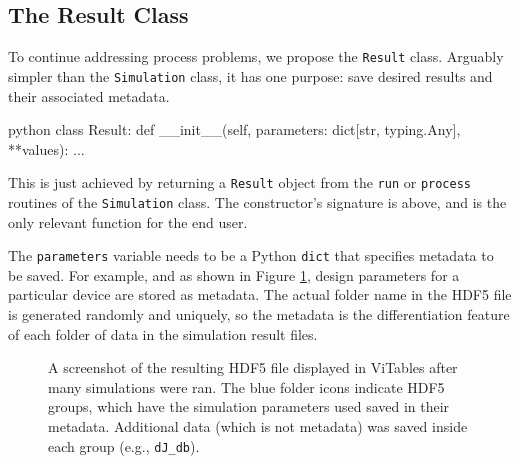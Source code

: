 \documentclass[12pt]{article}
\begin{document}
\subsection{The Result Class}
To continue addressing process problems, we propose the \texttt{Result} class. Arguably simpler than the \texttt{Simulation} class, it has one purpose: save desired results and their associated metadata. 

\begin{mintedbox}{python}
class Result:
	def __init__(self, parameters: dict[str, typing.Any], **values): 
	    ...
\end{mintedbox}

This is just achieved by returning a \texttt{Result} object from the \texttt{run} or \texttt{process} routines of the \texttt{Simulation} class. The constructor's signature is above, and is the only relevant function for the end user. 

The \texttt{parameters} variable needs to be a Python \texttt{dict} that specifies metadata to be saved. For example, and as shown in Figure \ref{fig.result_metadata}, design parameters for a particular device are stored as metadata. The actual folder name in the HDF5 file is generated randomly and uniquely, so the metadata is the differentiation feature of each folder of data in the simulation result files.

\begin{figure}
\caption{A screenshot of the resulting HDF5 file displayed in ViTables after many simulations were ran. The blue folder icons indicate HDF5 groups, which have the simulation parameters used saved in their metadata. Additional data (which is not metadata) was saved inside each group (e.g., \texttt{dJ_db}).}
\label{fig.result_metadata}
\end{figure}
\end{document}
